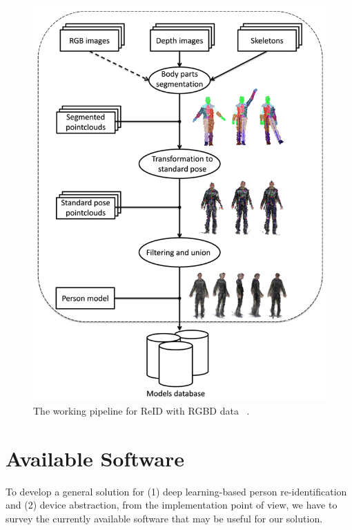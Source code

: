 \begin{figure}
    \begin{center}
        \includegraphics[scale=0.4]{figures/rgbd_for_reid.png}
        \caption{The working pipeline for ReID with RGBD data ~\protect \cite{rgbd-for-reid}.}
        \label{fig:rgbd-pipeline}
    \end{center}
\end{figure}

\section{Available Software}
\label{sec:related_work_framework}

To develop a general solution for (1) deep learning-based person 
re-identification and (2) device abstraction, from the implementation point of 
view, we have to survey the currently available software that may be useful for 
our solution.


